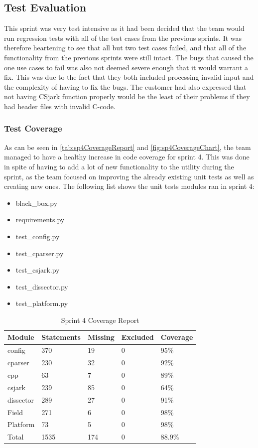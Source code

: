 \subsection{Test Evaluation}
This sprint was very test intensive as it had been decided that the team would run regression tests with all of the test cases from the previous sprints.
It was therefore heartening to see that all but two test cases failed, and that all of the functionality from the previous sprints were still intact.
The bugs that caused the one use cases to fail was also not deemed severe enough that it would warrant a fix. This was due to the fact that they both
included processing invalid input and the complexity of having to fix the bugs. The customer had also expressed that not having CSjark function properly
would be the least of their problems if they had header files with invalid C-code.

\subsubsection{Test Coverage}
As can be seen in \autoref{tab:sp4CoverageReport} and \autoref{fig:sp4CoverageChart}, the team managed to have a healthy increase in code coverage for sprint 4. This was done in spite of having to add a lot of new functionality to the utility during the sprint, as the team focused on improving the already existing unit tests as well as creating new ones. The following list shows the unit tests modules ran in sprint 4:

\begin{itemize}
	\item black\_box.py
	\item requirements.py
	\item test\_config.py
	\item test\_cparser.py
	\item test\_csjark.py
	\item test\_dissector.py
	\item test\_platform.py
\end{itemize}

\begin{table}[!htb] \footnotesize \center
	\caption{Sprint 4 Coverage Report\label{tab:sp4CoverageReport}}
	\begin{tabular}{l l l l l}
		\toprule
		Module & Statements & Missing & Excluded & Coverage\\
		\midrule
		config & 370 & 19 & 0 & 95\%\ \\
		cparser & 230 & 32 & 0 & 92\%\ \\
		cpp & 63 & 7 & 0 & 89\%\ \\
		csjark & 239 & 85 & 0 & 64\%\ \\
		dissector & 289 & 27 & 0 & 91\%\ \\
		Field & 271 & 6  & 0 & 98\%\ \\
		Platform & 73 & 5 & 0 & 98\%\ \\
		Total & 1535 & 174 & 0 & 88.9\%\ \\
		\bottomrule
	\end{tabular}
\end{table}

